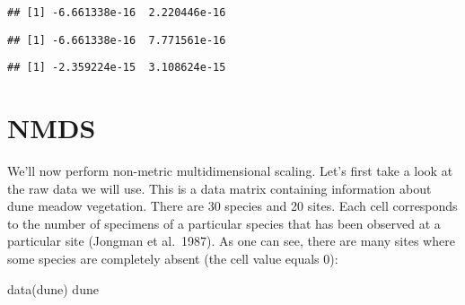 \documentclass[
]{book}
\newenvironment{Shaded}{\begin{snugshade}}{\end{snugshade}}
\newcommand{\FunctionTok}[1]{\textcolor[rgb]{0.00,0.00,0.00}{#1}}
\newcommand{\NormalTok}[1]{#1}
\newcommand{\SpecialCharTok}[1]{\textcolor[rgb]{0.00,0.00,0.00}{#1}}
\begin{document}
\begin{Shaded}
\end{Shaded}

\begin{verbatim}
## [1] -6.661338e-16  2.220446e-16
\end{verbatim}

\begin{Shaded}
\end{Shaded}

\begin{verbatim}
## [1] -6.661338e-16  7.771561e-16
\end{verbatim}

\begin{Shaded}
\end{Shaded}

\begin{verbatim}
## [1] -2.359224e-15  3.108624e-15
\end{verbatim}

\hypertarget{nmds}{%
\section{NMDS}\label{nmds}}

We'll now perform non-metric multidimensional scaling. Let's first take a look at the raw data we will use. This is a data matrix containing information about dune meadow vegetation. There are 30 species and 20 sites. Each cell corresponds to the number of specimens of a particular species that has been observed at a particular site (Jongman et al.~1987). As one can see, there are many sites where some species are completely absent (the cell value equals 0):

\begin{Shaded}
\begin{Highlighting}[]
\FunctionTok{data}\NormalTok{(dune)}
\NormalTok{dune}
\end{Highlighting}
\end{Shaded}
\end{document}

